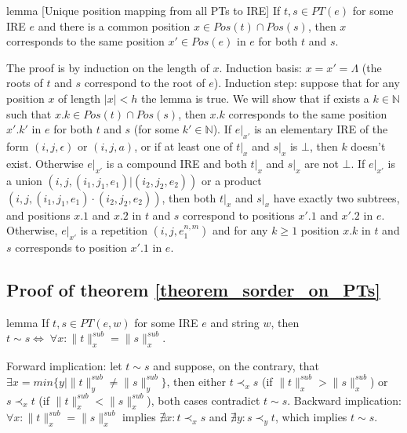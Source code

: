 \documentclass[AMA,STIX1COL]{WileyNJD-v2}
\newcommand{\YN}{\mathbb{N}}
\newcommand{\PT}{PT}
\newcommand{\snorm}[2]{\|{#1}\|^{sub}_{#2}}
\begin{document}
\begin{theoremEnd}{lemma}
[Unique position mapping from all PTs to IRE]
    \label{lemma_positions}
    If $t, s \in PT(e)$ for some IRE $e$
    and there is a common position $x \in Pos(t) \cap Pos(s)$,
    then $x$ corresponds to the same position $x' \in Pos(e)$ in $e$ for both $t$ and $s$.
\end{theoremEnd}
\begin{proofEnd}
    The proof is by induction on the length of $x$.
    Induction basis: $x = x' = \Lambda$ (the roots of $t$ and $s$ correspond to the root of $e$).
    Induction step: suppose that for any position $x$ of length $|x| < h$ the lemma is true.
    We will show that if exists a $k \in \YN$ such that $x.k \in Pos(t) \cap Pos(s)$,
    then $x.k$ corresponds to the same position $x'.k'$ in $e$ for both $t$ and $s$ (for some $k' \in \YN$).
    If $e|_{x'}$ is an elementary IRE of the form $(i, j, \epsilon)$ or $(i, j, a)$,
    or if at least one of $t|_x$ and $s|_x$ is $\bot$,
    then $k$ doesn't exist.
    Otherwise $e|_{x'}$ is a compound IRE and both $t|_x$ and $s|_x$ are not $\bot$.
    If $e|_{x'}$ is a union $(i, j, (i_1, j_1, e_1)|(i_2, j_2, e_2))$
    or a product $(i, j, (i_1, j_1, e_1)\cdot(i_2, j_2, e_2))$,
    then both $t|_x$ and $s|_x$ have exactly two subtrees,
    and positions $x.1$ and $x.2$ in $t$ and $s$ correspond to positions $x'.1$ and $x'.2$ in $e$.
    Otherwise, $e|_{x'}$ is a repetition $(i, j, e_1^{n,m})$
    and for any $k \geq 1$ position $x.k$ in $t$ and $s$ corresponds to position $x'.1$ in $e$.
\end{proofEnd}



\subsection*{Proof of theorem \ref{theorem_sorder_on_PTs}}

\begin{theoremEnd}{lemma}
    \label{lemma_incomparability_equivdef}
    If $t, s \in \PT(e, w)$ for some IRE $e$ and string $w$,
    then $t \sim s \Leftrightarrow \; \forall x : \snorm{t}{x} = \snorm{s}{x}$.
\end{theoremEnd}
\begin{proofEnd}
    Forward implication: let $t \sim s$ and suppose, on the contrary, that $\exists x = min \{ y \mid \snorm{t}{y} \neq \snorm{s}{y} \}$,
    then either $t \prec_x s$ (if $\snorm{t}{x} > \snorm{s}{x}$) or $s \prec_x t$ (if $\snorm{t}{x} < \snorm{s}{x}$),
    both cases contradict $t \sim s$.
    Backward implication: $\forall x : \snorm{t}{x} = \snorm{s}{x}$
    implies $\nexists x : t \prec_x s$ and $\nexists y : s \prec_y t$,
    which implies $t \sim s$.
\end{proofEnd}
\end{document}
